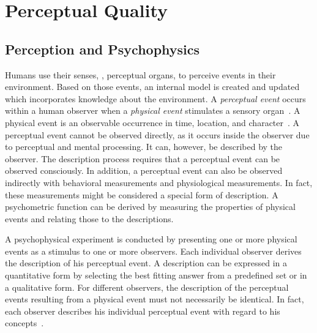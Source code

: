 \section{Perceptual Quality}
\subsection{Perception and Psychophysics}
Humans use their senses, \ie, perceptual organs, to perceive events in their environment.
Based on those events, an internal model is created and updated which incorporates knowledge about the environment.
A \emph{perceptual event} occurs within a human observer when a \emph{physical event} stimulates a sensory organ~\citep[p.\,5]{blauert_spatial_1996}.
A physical event is an observable occurrence in time, location, and character~\citep{le_callet_qualinet_2013}.
A perceptual event cannot be observed directly, as it occurs inside the observer due to perceptual and mental processing.
It can, however, be described by the observer.
The description process requires that a perceptual event can be observed consciously.
In addition, a perceptual event can also be observed indirectly with behavioral measurements and physiological measurements.
In fact, these measurements might be considered a special form of description.
A psychometric function can be derived by measuring the properties of physical events and relating those to the descriptions.

A psychophysical experiment is conducted by presenting one or more physical events as a stimulus to one or more observers.
Each individual observer derives the description of his perceptual event.
A description can be expressed in a quantitative form by selecting the best fitting answer from a predefined set or in a qualitative form.
For different observers, the description of the perceptual events resulting from a physical event must not necessarily be identical.
In fact, each observer describes his individual perceptual event with regard to his concepts~\citep[p.\,11]{blauert_spatial_1996}.

